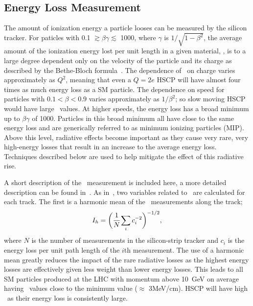 \subsection{Energy Loss Measurement \label{sec:DedxMeasurement}}
The amount of ionization energy a particle looses can be measured by the silicon tracker.
For paticles with 0.1 $\gtrsim \beta \gamma \lesssim$ 1000, where $\gamma$ is $1/\sqrt{1 - \beta^2}$,
the average amount of the ionization energy lost per unit length in a given material, \dedx, is to a large degree dependent only on the velocity of the particle
and its charge as described by the Bethe-Bloch formula~\cite{PDG}.
The dependence of \dedx\  on charge varies approximately as $Q^2$, meaning that even a $Q=2e$ HSCP will have almost four times as much energy loss as a SM particle. 
The dependence on speed for particles with $0.1 < \beta < 0.9$ varies approximately as $1/\beta^2$; so slow moving HSCP would have large \dedx\ values.
At higher speeds, the energy loss has a broad minimum up to $\beta \gamma$ of 1000.
Particles in this broad minimum all have close to the same energy loss and are generically referred to as minimum ionizing particles (MIP).
Above this level, radiative effects become important as they cause very rare, very high-energy losses that result in an increase to the average energy loss.
Techniques described below are used to help mitigate the effect of this radiative rise.

A short description of the \dedx\ measurement is included here, a more detailed description can be found in~\cite{CMS-PAS-TRK-10-001, Khachatryan:2011ts, Quertenmont:1361029}.
As in~\cite{Chatrchyan:2012sp}, two variables related to \dedx\ are calculated for each track. 
The first is a harmonic mean of the \dedx\ measurements along the track;
\begin{equation}
 I_h= \biggl( \cfrac{1}{N} \sum_i c_{i}^{-2} \biggr)^{-1/2},
 \label{eq:HarmonicEstimator}
\end{equation}
where $N$ is the number of measurements in the silicon-strip tracker and $c_{i}$ is the energy loss per unit path length
of the $i$th measurement. The use of a harmonic mean greatly reduces the impact of the rare radiative losses as the highest energy
losses are effectively given less weight than lower energy losses. This leads to all
SM particles produced at the LHC with momentum above 10~GeV on average having \ih\ values close to the minimum value ($\approx$ 3MeV/cm). 
HSCP will have high \ih\ as their energy loss is consistently large.

